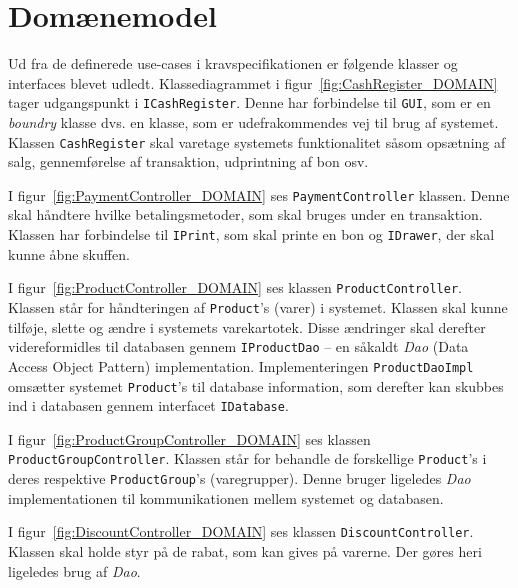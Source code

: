 \section{Domænemodel}
Ud fra de definerede use-cases i kravspecifikationen er følgende klasser og interfaces blevet udledt. Klassediagrammet i figur~\ref{fig:CashRegister_DOMAIN} tager udgangspunkt i \texttt{ICashRegister}. Denne har forbindelse til \texttt{GUI}, som er en \textit{boundry} klasse dvs. en klasse, som er udefrakommendes vej til brug af systemet. Klassen \texttt{CashRegister} skal varetage systemets funktionalitet såsom opsætning af salg, gennemførelse af transaktion, udprintning af bon osv.


I figur~\ref{fig:PaymentController_DOMAIN} ses \texttt{PaymentController} klassen. Denne skal håndtere hvilke betalingsmetoder, som skal bruges under en transaktion. Klassen har forbindelse til \texttt{IPrint}, som skal printe en bon og \texttt{IDrawer}, der skal kunne åbne skuffen.

I figur~\ref{fig:ProductController_DOMAIN} ses klassen \texttt{ProductController}. Klassen står for håndteringen af \texttt{Product}'s (varer) i systemet. Klassen skal kunne tilføje, slette og ændre i systemets varekartotek. Disse ændringer skal derefter videreformidles til databasen gennem \texttt{IProductDao} -- en såkaldt \textit{Dao} (Data Access Object Pattern) implementation. Implementeringen \texttt{ProductDaoImpl} omsætter systemet \texttt{Product}'s til database information, som derefter kan skubbes ind i databasen gennem interfacet \texttt{IDatabase}.


I figur~\ref{fig:ProductGroupController_DOMAIN} ses klassen \texttt{ProductGroupController}. Klassen står for behandle de forskellige \texttt{Product}'s i deres respektive \texttt{ProductGroup}'s (varegrupper). Denne bruger ligeledes \textit{Dao} implementationen til kommunikationen mellem systemet og databasen.


I figur~\ref{fig:DiscountController_DOMAIN} ses klassen \texttt{DiscountController}. Klassen skal holde styr på de rabat, som kan gives på varerne. Der gøres heri ligeledes brug af \textit{Dao}.

